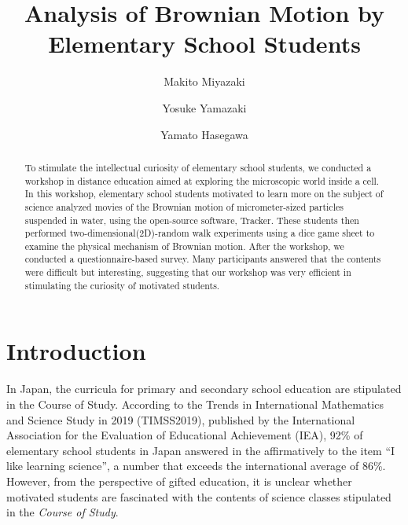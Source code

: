 \documentclass[10pt, aps, prb, preprint, longbibliography, superscriptaddress]{revtex4-2}
\begin{document}
\title{Analysis of Brownian Motion by Elementary School Students}

\author{Makito Miyazaki}
%
\author{Yosuke Yamazaki}
%
\author{Yamato Hasegawa}


\begin{abstract}
	To stimulate the intellectual curiosity of elementary school students,
	we conducted a workshop in distance education aimed at exploring the microscopic world inside a cell.
	In this workshop, elementary school students motivated to learn more on the subject of science
	analyzed movies of the Brownian motion of micrometer-sized particles suspended in water,
	\cite{howard_random, paul_2003, marco_2013}
	using the open-source software, Tracker.\cite{tracker, douglas_2011}
	These students then performed two-dimensional(2D)-random walk experiments
	using a dice game sheet to examine the physical mechanism of Brownian motion.\cite{oosawa_hand}
	After the workshop, we conducted a questionnaire-based survey.
	Many participants answered that the contents were difficult but interesting,
	suggesting that our workshop was very efficient in stimulating the curiosity of motivated students.

\end{abstract}

\maketitle

\section{Introduction}
\label{intro}

In Japan, the curricula for primary and secondary school education are stipulated
in the Course of Study.\cite{shido_elem}
According to the Trends in International Mathematics and Science Study in 2019 (TIMSS2019),
published by the International Association for the Evaluation of Educational Achievement (IEA),\cite{timss}
92\% of elementary school students in Japan answered in the affirmatively
to the item ``I like learning science'', a number that exceeds the international average of 86\%.
However, from the perspective of gifted education,
it is unclear whether motivated students are fascinated with the contents of science classes
stipulated in the \textit{Course of Study}.
\end{document}
